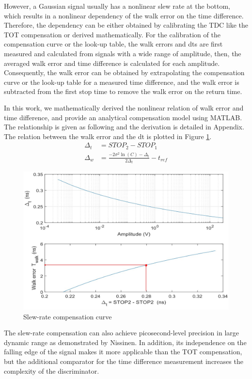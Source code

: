 However, a Gaussian signal usually has a nonlinear slew rate at the bottom, which results in a nonlinear dependency of the walk error on the time difference. Therefore, the dependency can be either obtained by calibrating the TDC like the TOT compensation or derived mathematically. For the calibration of the compensation curve or the look-up table, the walk errors and dts are first measured and calculated from signals with a wide range of amplitude, then, the averaged walk error and time difference is calculated for each amplitude. Consequently, the walk error can be obtained by extrapolating the compensation curve or the look-up table for a measured time difference, and the walk error is subtracted from the first stop time to remove the walk error on the return time.\par
In this work, we mathematically derived the nonlinear relation of walk error and time difference, and provide an analytical compensation model using MATLAB. The relationship is given as following and the derivation is detailed in Appendix. The relation between the walk error and the dt is plotted in Figure \ref{fig:TDC_slewrate_curve}.
\begin{align}
    \Delta_t&=STOP_2-STOP_1\\
    \Delta_w&=\frac{-2\sigma^2\ln(C)-\Delta_t}{2\Delta_t}-t_{ref}
\end{align}
\begin{figure}[t!p]
\centering
\includegraphics[width=1\textwidth]{figures/chapter3_TDC/slew-rate_curve.jpg}
\caption{Slew-rate compensation curve}
\label{fig:TDC_slewrate_curve}
\end{figure}
The slew-rate compensation can also achieve picosecond-level precision in large dynamic range as demonstrated by Nissinen. In addition, its independence on the falling edge of the signal makes it more applicable than the TOT compensation, but the additional comparator for the time difference measurement increases the complexity of the discriminator. \par
